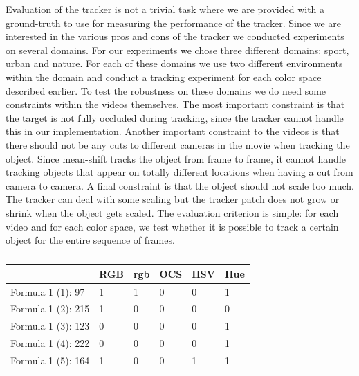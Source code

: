 \documentclass[a4paper,11pt]{article}
\begin{document}
		Evaluation of the tracker is not a trivial task where we are provided with a ground-truth
		to use for measuring the performance of the tracker. Since we are interested in the various
		pros and cons of the tracker we conducted experiments on several domains. For our experiments
		we chose three different domains: sport, urban and nature. For each of these domains we use
		two different environments within the domain and conduct a tracking experiment for each color
		space described earlier. To test the robustness on these domains we do need some constraints
		within the videos themselves. The most important constraint is that the target is not fully
		occluded during tracking, since the tracker cannot handle this in our implementation. Another
		important constraint to the videos is that there should not be any cuts to different cameras
		in the movie when tracking the object. Since mean-shift tracks the object from frame to frame,
		it cannot handle tracking objects that appear on totally different locations when having a cut
		from camera to camera. A final constraint is that the object should not scale too much. The
		tracker can deal with some scaling but the tracker patch does not grow or shrink when the object
		gets scaled. The evaluation criterion is simple: for each video and for each color space, we test
		whether it is possible to track a certain object for the entire sequence of frames.
		\begin{table}[H]
			\centering
			\begin{tabular}{ | l | l | l | l | l | l |}
			\hline
			                   & RGB & rgb & OCS & HSV & Hue \\
			\hline
			Formula 1 (1):  97 & 1   & 1   & 0   & 0   & 1 \\
			Formula 1 (2): 215 & 1   & 0   & 0   & 0   & 0 \\
			Formula 1 (3): 123 & 0   & 0   & 0   & 0   & 1 \\
			Formula 1 (4): 222 & 0   & 0   & 0   & 0   & 1 \\
			Formula 1 (5): 164 & 1   & 0   & 0   & 1   & 1 \\
			\hline
			\end{tabular}
			\caption{}
		\end{table}
\end{document}
